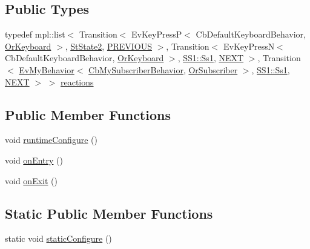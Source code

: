 \subsection*{Public Types}
\begin{DoxyCompactItemize}
\item 
typedef mpl\+::list$<$ Transition$<$ Ev\+Key\+PressP$<$ Cb\+Default\+Keyboard\+Behavior, \hyperlink{classsm__ferrari_1_1OrKeyboard}{Or\+Keyboard} $>$, \hyperlink{structsm__ferrari_1_1StState2}{St\+State2}, \hyperlink{structsm__ferrari_1_1StState3_1_1PREVIOUS}{P\+R\+E\+V\+I\+O\+US} $>$, Transition$<$ Ev\+Key\+PressN$<$ Cb\+Default\+Keyboard\+Behavior, \hyperlink{classsm__ferrari_1_1OrKeyboard}{Or\+Keyboard} $>$, \hyperlink{structsm__ferrari_1_1SS1_1_1Ss1}{S\+S1\+::\+Ss1}, \hyperlink{structsm__ferrari_1_1StState3_1_1NEXT}{N\+E\+XT} $>$, Transition$<$ \hyperlink{structsm__ferrari_1_1cl__subscriber_1_1EvMyBehavior}{Ev\+My\+Behavior}$<$ \hyperlink{classsm__ferrari_1_1cl__subscriber_1_1CbMySubscriberBehavior}{Cb\+My\+Subscriber\+Behavior}, \hyperlink{classsm__ferrari_1_1OrSubscriber}{Or\+Subscriber} $>$, \hyperlink{structsm__ferrari_1_1SS1_1_1Ss1}{S\+S1\+::\+Ss1}, \hyperlink{structsm__ferrari_1_1StState3_1_1NEXT}{N\+E\+XT} $>$ $>$ \hyperlink{structsm__ferrari_1_1StState3_a6b4cf02dd8c8393ff525bd4c014301a7}{reactions}
\end{DoxyCompactItemize}
\subsection*{Public Member Functions}
\begin{DoxyCompactItemize}
\item 
void \hyperlink{structsm__ferrari_1_1StState3_aff80710783f94ee3d8d430da69c2a34f}{runtime\+Configure} ()
\item 
void \hyperlink{structsm__ferrari_1_1StState3_a1eb6cb90f31a755933a6f90c3b93da02}{on\+Entry} ()
\item 
void \hyperlink{structsm__ferrari_1_1StState3_a8daa8639391cb98bc3ba5ac146cd19ad}{on\+Exit} ()
\end{DoxyCompactItemize}
\subsection*{Static Public Member Functions}
\begin{DoxyCompactItemize}
\item 
static void \hyperlink{structsm__ferrari_1_1StState3_af8e946a7e28a4b5dbc43615a3e83b9db}{static\+Configure} ()
\end{DoxyCompactItemize}
